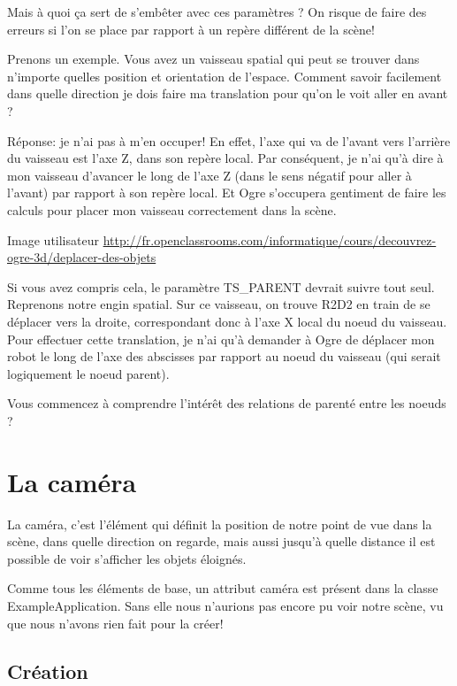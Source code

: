 Mais à quoi \c{c}a sert de s'embêter avec ces paramètres ? On risque de faire des erreurs si l'on se place par rapport à un repère différent de la scène!

Prenons un exemple. Vous avez un vaisseau spatial qui peut se trouver dans n'importe quelles position et orientation de l'espace. Comment savoir facilement dans quelle direction je dois faire ma translation pour qu'on le voit aller en avant ?

Réponse: je n'ai pas à m'en occuper! En effet, l'axe qui va de l'avant vers l'arrière du vaisseau est l'axe Z, dans son repère local. Par conséquent, je n'ai qu'à dire à mon vaisseau d'avancer le long de l'axe Z (dans le sens négatif pour aller à l'avant) par rapport à son repère local. Et Ogre s'occupera gentiment de faire les calculs pour placer mon vaisseau correctement dans la scène.

Image utilisateur \url{http://fr.openclassrooms.com/informatique/cours/decouvrez-ogre-3d/deplacer-des-objets}

Si vous avez compris cela, le paramètre TS\_PARENT devrait suivre tout seul. Reprenons notre engin spatial.
Sur ce vaisseau, on trouve R2D2 en train de se déplacer vers la droite, correspondant donc à l'axe X local du noeud du vaisseau. Pour effectuer cette translation, je n'ai qu'à demander à Ogre de déplacer mon robot le long de l'axe des abscisses par rapport au noeud du vaisseau (qui serait logiquement le noeud parent).

Vous commencez à comprendre l'intérêt des relations de parenté entre les noeuds ?









\section{La caméra}


La caméra, c'est l'élément qui définit la position de notre point de vue dans la scène, dans quelle direction on regarde, mais aussi jusqu'à quelle distance il est possible de voir s'afficher les objets éloignés.

Comme tous les éléments de base, un attribut caméra est présent dans la classe ExampleApplication. Sans elle nous n'aurions pas encore pu voir notre scène, vu que nous n'avons rien fait pour la créer!



\subsection{Création}

